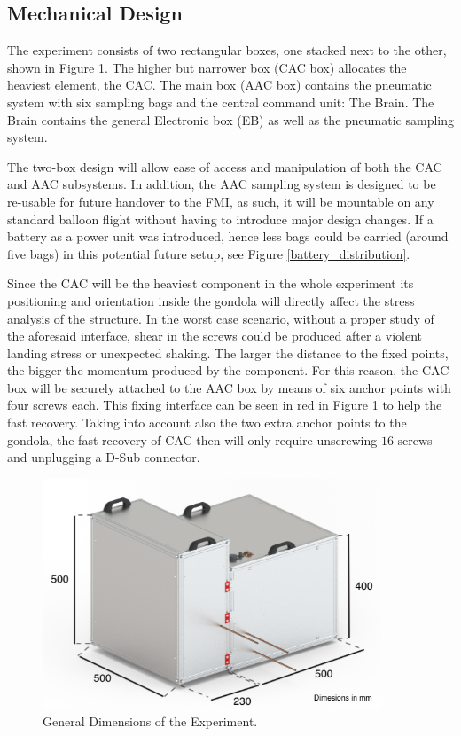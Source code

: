 \pagebreak
\subsection{Mechanical Design} \label{Mechanical_Design}
\label{sec:mechanical-design}

The experiment consists of two rectangular boxes, one stacked next to the other, shown in Figure \ref{dimensions}. The higher but narrower box (CAC box) allocates the heaviest element, the CAC. The main box (AAC box) contains the pneumatic system with six sampling bags and the central command unit: The Brain. The Brain contains the general Electronic box (EB) as well as the pneumatic sampling system.

The two-box design will allow ease of access and manipulation of both the CAC and AAC subsystems. In addition, the AAC sampling system is designed to be re-usable for future handover to the FMI, as such, it will be mountable on any standard balloon flight without having to introduce major design changes. If a battery as a power unit was introduced, hence less bags could be carried (around five bags) in this potential future setup, see Figure \ref{battery_distribution}.

\smallskip
Since the CAC will be the heaviest component in the whole experiment its positioning and orientation inside the gondola will directly affect the stress analysis of the structure. In the worst case scenario, without a proper study of the aforesaid interface, shear in the screws could be produced after a violent landing stress or unexpected shaking. The larger the distance to the fixed points, the bigger the momentum produced by the component. For this reason, the CAC box will be securely attached to the AAC box by means of six anchor points with four screws each. This fixing interface can be seen in red in Figure \ref{dimensions} to help the fast recovery. Taking into account also the two extra anchor points to the gondola, the fast recovery of CAC then will only require unscrewing $16$ screws and unplugging a D-Sub connector.

 \begin{figure}[H]
     \centering
     \includegraphics[width=0.9\textwidth]{4-experiment-design/img/Mechanical/Figure_14.png}
     \caption{General Dimensions of the Experiment.}
     \label{dimensions}
\end{figure}

